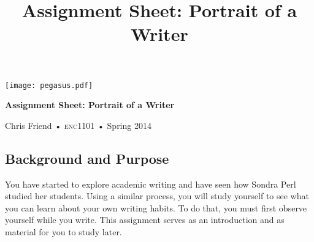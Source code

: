 \documentclass[10pt, oneside]{amsart}	%
\title[Portrait of a Writer]{Assignment Sheet: Portrait of a Writer}
\begin{document}
%

\vspace{-2in}
\begin{center}
\huge
\texttt{[image: pegasus.pdf]}

\textbf{Assignment Sheet: Portrait of a Writer}

{\normalsize Chris Friend • \textsc{enc1101} • Spring 2014}
\end{center}
\vspace{1\baselineskip}

\begin{multicols}{2}
\thispagestyle{empty}
	\section{Background and Purpose} %
	\label{sec:purpose}
	You have started to explore academic writing and have seen how Sondra Perl studied her students. Using a similar process, you will study yourself to see what you can learn about your own writing habits. To do that, you must first observe yourself while you write. This assignment serves as an introduction and as material for you to study later.


\end{multicols}
\end{document}
